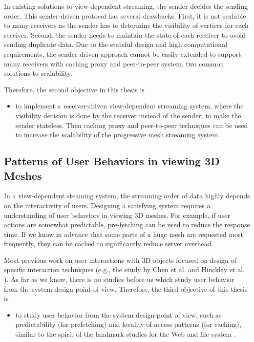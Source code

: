 \documentclass[11pt, a4paper]{report}
\begin{document}
    In existing solutions to view-dependent streaming,  
    the sender decides the sending order. 
    This sender-driven protocol has several drawbacks. 
    First, it is not scalable to many receivers as the sender has to
    determine the visibility of vertices for each receiver. 
    Second, the sender needs to maintain
    the state of each receiver to avoid sending duplicate data. 
    Due to the stateful design and high computational requirements,
    the sender-driven approach cannot be easily extended to support 
    many receivers with caching proxy and peer-to-peer system,
    two common solutions to scalability. 

    Therefore, the second objective in this thesis is 
    \begin{itemize}
        \item
            to implement 
            a receiver-driven view-dependent streaming system, where
            the visibility decision is done by the receiver instead of the sender,
            to make the sender stateless.
            Then caching proxy and peer-to-peer techniques can be used to increase the 
            scalability of the progressive mesh streaming system.
    \end{itemize}

    \subsection{Patterns of User Behaviors in viewing 3D Meshes}
    In a view-dependent steaming system, the streaming order of data highly
    depends on the interactivity of users. Designing a satisfying system
    requires a understanding of user behaviors in viewing 3D meshes.
    For example, if user actions are somewhat predictable, pre-fetching can 
    be used to reduce the response time. If we know in advance that some parts
    of a huge mesh are requested most frequently, they can be 
    cached to significantly reduce server overhead.
    
    Most previous work on user interactions with 3D objects focused on design
    of specific interaction techniques (e.g., the study by Chen et al. \cite{chen88study}
    and Hinckley et al. \cite{hinckley97usability}). 
    As far as we know, there is no studies before us which study user behavior
    from the system design point of view.
    Therefore, the third objective of this thesis is 
    \begin{itemize}
        \item
            to study user behavior from 
            the system design point of view, such as predictability (for prefetching)
            and locality of access patterns (for caching), similar to the spirit
            of the landmark studies for the Web \cite{huberman98web} and file system
            \cite {ousterhout85trace}. 
    \end{itemize}
\end{document}
